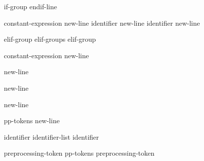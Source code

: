 \begin{bnf}
\br
    if-group   endif-line
\end{bnf}

\begin{bnftab}
\br
\>\>\>constant-expression new-line \br
\>\>\>identifier new-line \br
\>\>\>identifier new-line 
\end{bnftab}

\begin{bnf}
\br
    elif-group\br
    elif-groups elif-group
\end{bnf}

\begin{bnftab}
\br
\>\>\>constant-expression new-line 
\end{bnftab}

\begin{bnftab}
\br
\>\>\>new-line 
\end{bnftab}

\begin{bnftab}
\br
\>\>\>new-line
\end{bnftab}

\begin{bnf}
\br
     new-line
\end{bnf}

\begin{bnf}
\br
    pp-tokens new-line
\end{bnf}

\begin{bnf}
\br
\end{bnf}

\begin{bnf}
\br
    identifier\br
    identifier-list \terminal{,} identifier
\end{bnf}

\begin{bnf}
\br
\end{bnf}

\begin{bnf}
\br
    preprocessing-token\br
    pp-tokens preprocessing-token
\end{bnf}


